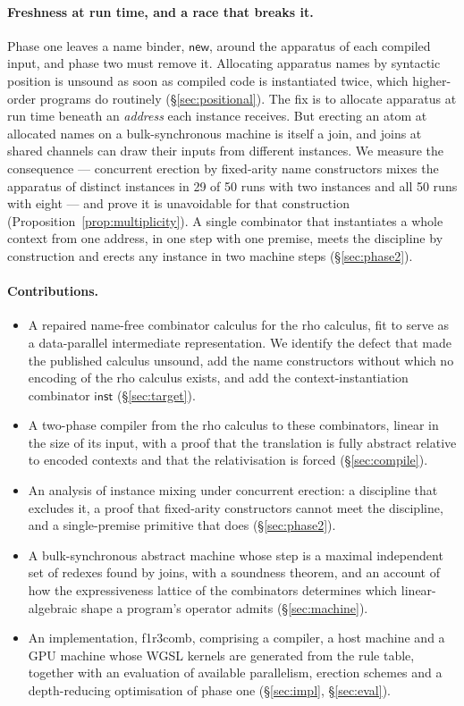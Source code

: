 \documentclass[acmsmall,screen,review,anonymous]{acmart}
\newcommand{\inst}{\mathsf{inst}}
\newcommand{\tool}{\textsf{f1r3comb}}
\begin{document}
\paragraph{Freshness at run time, and a race that breaks it.}
Phase one leaves a name binder, $\mathsf{new}$, around the apparatus of each
compiled input, and phase two must remove it. Allocating apparatus names by
syntactic position is unsound as soon as compiled code is instantiated
twice, which higher-order programs do routinely (\S\ref{sec:positional}). The
fix is to allocate apparatus at run time beneath an \emph{address} each
instance receives. But erecting an atom at allocated names on a
bulk-synchronous machine is itself a join, and joins at shared channels can
draw their inputs from different instances. We measure the consequence ---
concurrent erection by fixed-arity name constructors mixes the apparatus of
distinct instances in 29 of 50 runs with two instances and all 50 runs with
eight --- and prove it is unavoidable for that construction
(Proposition~\ref{prop:multiplicity}). A single combinator that instantiates
a whole context from one address, in one step with one premise, meets the
discipline by construction and erects any instance in two machine steps
(\S\ref{sec:phase2}).

\paragraph{Contributions.}
\begin{itemize}[leftmargin=1.5em]
\item A repaired name-free combinator calculus for the rho calculus, fit to
  serve as a data-parallel intermediate representation. We identify the
  defect that made the published calculus unsound, add the name
  constructors without which no encoding of the rho calculus exists, and
  add the context-instantiation combinator $\inst$ (\S\ref{sec:target}).
\item A two-phase compiler from the rho calculus to these combinators,
  linear in the size of its input, with a proof that the translation is
  fully abstract relative to encoded contexts and that the relativisation
  is forced (\S\ref{sec:compile}).
\item An analysis of instance mixing under concurrent erection: a
  discipline that excludes it, a proof that fixed-arity constructors cannot
  meet the discipline, and a single-premise primitive that does
  (\S\ref{sec:phase2}).
\item A bulk-synchronous abstract machine whose step is a maximal
  independent set of redexes found by joins, with a soundness theorem, and
  an account of how the expressiveness lattice of the combinators
  determines which linear-algebraic shape a program's operator admits
  (\S\ref{sec:machine}).
\item An implementation, \tool{}, comprising a compiler, a host machine and a
  GPU machine whose WGSL kernels are generated from the rule table, together
  with an evaluation of available parallelism, erection schemes and a
  depth-reducing optimisation of phase one (\S\ref{sec:impl},
  \S\ref{sec:eval}).
\end{itemize}
\end{document}
